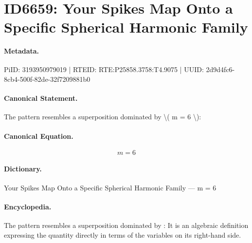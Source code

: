 \section*{ID6659: Your Spikes Map Onto a Specific Spherical Harmonic Family}
\paragraph{Metadata.}
PiID: 3193950979019 | RTEID: RTE:P25858.3758:T4.9075 | UUID: 2d9d4fc6-8cb4-500f-82de-32f7209881b0

\paragraph{Canonical Statement.}
The pattern resembles a superposition dominated by \textbackslash{}( m = 6 \textbackslash{}):

\paragraph{Canonical Equation.}
\[
m = 6
\]

\paragraph{Dictionary.}
Your Spikes Map Onto a Specific Spherical Harmonic Family — m = 6

\paragraph{Encyclopedia.}
The pattern resembles a superposition dominated by : It is an algebraic definition expressing the quantity directly in terms of the variables on its right-hand side.
